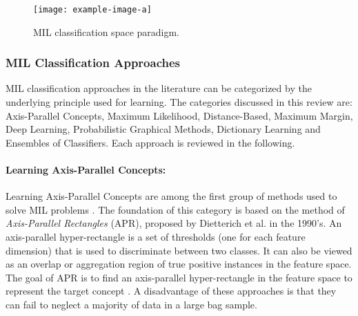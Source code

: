 \begin{center}
	\begin{figure*}[h]
		\centering
		\texttt{[image: example-image-a]}
		\caption[MIL classification space paradigm.]{MIL classification space paradigm.}
		\label{fig:mil_classification_space_paradigm}
	\end{figure*}
\end{center}

\subsubsection{MIL Classification Approaches}
MIL classification approaches in the literature can be categorized by the underlying principle used for learning.  The categories discussed in this review are: Axis-Parallel Concepts, Maximum Likelihood, Distance-Based, Maximum Margin,  Deep Learning, Probabilistic Graphical Methods, Dictionary Learning and Ensembles of Classifiers.  Each approach is reviewed in the following.

\paragraph{Learning Axis-Parallel Concepts:}
Learning Axis-Parallel Concepts are among the first group of methods used to solve MIL problems \citep{Dietterich1996AxisParallelRectangles}.  The foundation of this category is based on the method of \textit{Axis-Parallel Rectangles} (APR), proposed by Dietterich et al. in the 1990's.  An axis-parallel hyper-rectangle is a set of thresholds (one for each feature dimension) that is used to discriminate between two classes. It can also be viewed as an overlap or aggregation region of true positive instances in the feature space. The goal of APR is to find an axis-parallel hyper-rectangle in the feature space to represent the target concept \citep{Ghaffarzadegan2018MILVAE, Bocinsky2019SPIEMIACEInitialization, Jiao2017Thesis}.  A disadvantage of these approaches is that they can fail to neglect a majority of data in a large bag sample.    

